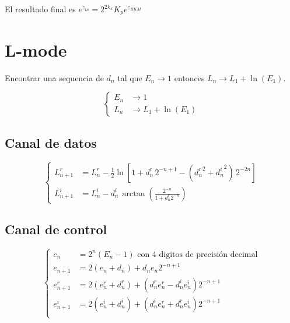 \documentclass[10pt,a4paper]{book}
\begin{document}
   El resultado final es $e^{z_{in}} = 2^{2k_x} K_p e^{z_{BKM}}$ 


\section{L-mode}
   Encontrar una sequencia de $d_n$ tal que $E_n \rightarrow 1$ entonces $L_n \rightarrow L_1 + \ln(E_1)$.

\begin{equation} \label{eq:bkm_E_mode}
   \left\{
      \begin{aligned}
         E_n & \rightarrow 1 \\
         L_n & \rightarrow L_1 + \ln(E_1)
      \end{aligned}
   \right.
\end{equation}

   \subsection{Canal de datos}
\begin{equation} \label{eq:bkm_eqs_L}
   \left\{
      \begin{aligned}
         L_{n+1}^r &= L_n^r - \frac{1}{2} \ln[ 1 + d_n^r \, 2^{-n+1} - ({d_n^r}^2 + {d_n^i}^2) \, 2^{-2n} ] \\
         L_{n+1}^i &= L_n^i - d_n^i \, \arctan{ \left( \frac{2^{-n}}{1+d_n^r 2^{-n}} \right) }
      \end{aligned}
   \right.
\end{equation}

   \subsection{Canal de control}
\begin{equation} \label{eq:bkm_eqs_e}
   \left\{
      \begin{aligned}
         e_n         &= 2^n (E_n - 1) \,\,\text{con 4 digitos de precisión decimal} \\
         e_{n+1}     &= 2 (e_n   + d_n) + d_n e_n 2^{-n+1}                          \\
         e_{n+1}^r   &= 2 (e_n^r + d_n^r) + (d_n^r e_n^r - d_n^i e_n^i) 2^{-n+1}    \\
         e_{n+1}^i   &= 2 (e_n^i + d_n^i) + (d_n^i e_n^r + d_n^r e_n^i) 2^{-n+1}    \\
      \end{aligned}
   \right.
\end{equation}
\end{document}
